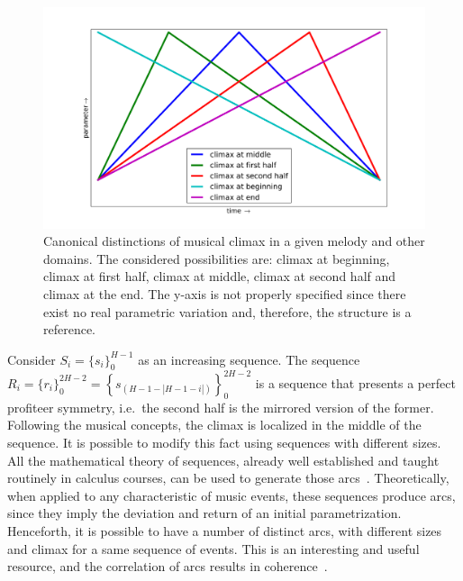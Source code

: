 \documentclass[
 aip,
 jmp,
 amsmath,amssymb,
 reprint,
]{revtex4-1}
\begin{document}
\begin{figure}[h!]
    \centering
        \includegraphics[width=\columnwidth]{figures/climax}
        \caption{Canonical distinctions of musical climax in a given melody and
        other domains. The considered possibilities are: climax at beginning,
        climax at first half, climax at middle, climax at second half and climax
        at the end. The y-axis is not properly specified since there exist no
        real parametric variation and, therefore, the structure is a reference.}
        \label{fig:climax}
\end{figure}

Consider $S_i=\{s_i\}_0^{H-1}$ as an increasing sequence. The sequence
$R_i=\{r_i\}_0^{2H -2}=\left\{s_{(H-1-|H-1-i|)}\right\}_0^{2H-2}$ is a sequence
that presents a perfect profiteer symmetry, i.e.\ the second half is the
mirrored version of the former. Following the musical concepts, the climax is
localized in the middle of the sequence. It is possible to modify this
fact using sequences with different sizes. All the mathematical theory of
sequences, already well established and taught routinely in calculus courses, can be
used to generate those arcs~\cite{Guidorizzo,Schoenberg}. 
Theoretically, when applied to any characteristic of music events, these sequences produce arcs, since they imply the deviation and return of an initial
parametrization. Henceforth, it is possible to have a
number of distinct arcs, with different sizes and climax for a same sequence of events. This is an interesting and useful resource, and the correlation of arcs results in coherence~\cite{Salzer}.
\end{document}
